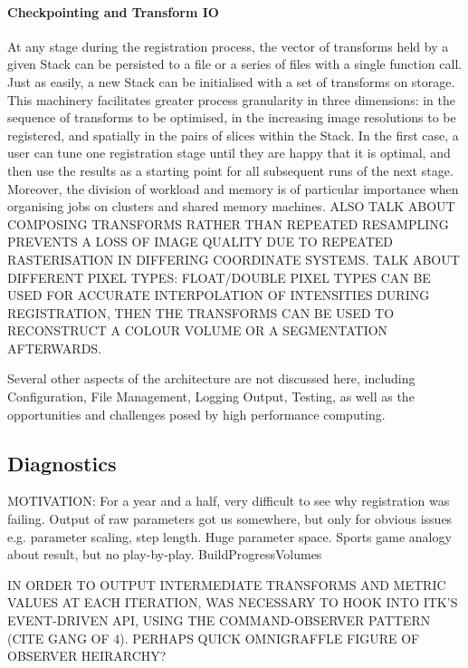         \paragraph{Checkpointing and Transform IO}
          At any stage during the registration process, the vector of transforms held by a given Stack can be persisted to a file or a series of files with a single function call. Just as easily, a new Stack can be initialised with a set of transforms on storage. This machinery facilitates greater process granularity in three dimensions: in the sequence of transforms to be optimised, in the increasing image resolutions to be registered, and spatially in the pairs of slices within the Stack. In the first case, a user can tune one registration stage until they are happy that it is optimal, and then use the results as a starting point for all subsequent runs of the next stage. Moreover, the division of workload and memory is of particular importance when organising jobs on clusters and shared memory machines. ALSO TALK ABOUT COMPOSING TRANSFORMS RATHER THAN REPEATED RESAMPLING PREVENTS A LOSS OF IMAGE QUALITY DUE TO REPEATED RASTERISATION IN DIFFERING COORDINATE SYSTEMS. TALK ABOUT DIFFERENT PIXEL TYPES: FLOAT/DOUBLE PIXEL TYPES CAN BE USED FOR ACCURATE INTERPOLATION OF INTENSITIES DURING REGISTRATION, THEN THE TRANSFORMS CAN BE USED TO RECONSTRUCT A COLOUR VOLUME OR A SEGMENTATION AFTERWARDS.
          
          \vspace{3 mm}

          Several other aspects of the architecture are not discussed here, including Configuration, File Management, Logging Output, Testing, as well as the opportunities and challenges posed by high performance computing.
    
  
    \subsection{Diagnostics} %
    \label{sub:diagnostics}
      
      MOTIVATION: For a year and a half, very difficult to see why registration was failing. Output of raw parameters got us somewhere, but only for obvious issues e.g. parameter scaling, step length. Huge parameter space. Sports game analogy about result, but no play-by-play. BuildProgressVolumes
      
      IN ORDER TO OUTPUT INTERMEDIATE TRANSFORMS AND METRIC VALUES AT EACH ITERATION, WAS NECESSARY TO HOOK INTO ITK'S EVENT-DRIVEN API, USING THE COMMAND-OBSERVER PATTERN (CITE GANG OF 4). PERHAPS QUICK OMNIGRAFFLE FIGURE OF OBSERVER HEIRARCHY?
      

